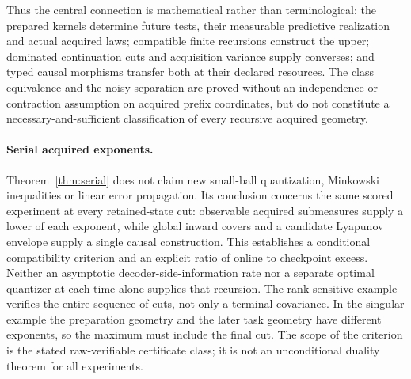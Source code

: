 Thus the central connection is mathematical rather than terminological: the prepared kernels determine future tests, their measurable predictive realization and actual acquired laws; compatible finite recursions construct the upper; dominated continuation cuts and acquisition variance supply converses; and typed causal morphisms transfer both at their declared resources. The class equivalence and the noisy separation are proved without an independence or contraction assumption on acquired prefix coordinates, but do not constitute a necessary-and-sufficient classification of every recursive acquired geometry.

\paragraph{Serial acquired exponents.}
Theorem~\ref{thm:serial} does not claim new small-ball quantization, Minkowski inequalities or linear error propagation. Its conclusion concerns the same scored experiment at every retained-state cut: observable acquired submeasures supply a lower of each exponent, while global inward covers and a candidate Lyapunov envelope supply a single causal construction. This establishes a conditional compatibility criterion and an explicit ratio of online to checkpoint excess. Neither an asymptotic decoder-side-information rate nor a separate optimal quantizer at each time alone supplies that recursion. The rank-sensitive example verifies the entire sequence of cuts, not only a terminal covariance. In the singular example the preparation geometry and the later task geometry have different exponents, so the maximum must include the final cut. The scope of the criterion is the stated raw-verifiable certificate class; it is not an unconditional duality theorem for all experiments.
